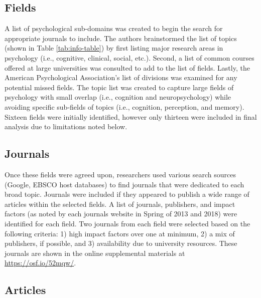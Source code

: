 \documentclass[english,man]{apa6}
\theoremstyle{definition}
\theoremstyle{definition}
\theoremstyle{definition}
\theoremstyle{remark}
\begin{document}
\subsection{Fields}\label{fields}

A list of psychological sub-domains was created to begin the search for
appropriate journals to include. The authors brainstormed the list of
topics (shown in Table \ref{tab:info-table}) by first listing major
research areas in psychology (i.e., cognitive, clinical, social, etc.).
Second, a list of common courses offered at large universities was
consulted to add to the list of fields. Lastly, the American
Psychological Association's list of divisions was examined for any
potential missed fields. The topic list was created to capture large
fields of psychology with small overlap (i.e., cognition and
neuropsychology) while avoiding specific sub-fields of topics (i.e.,
cognition, perception, and memory). Sixteen fields were initially
identified, however only thirteen were included in final analysis due to
limitations noted below.

\subsection{Journals}\label{journals}

Once these fields were agreed upon, researchers used various search
sources (Google, EBSCO host databases) to find journals that were
dedicated to each broad topic. Journals were included if they appeared
to publish a wide range of articles within the selected fields. A list
of journals, publishers, and impact factors (as noted by each journals
website in Spring of 2013 and 2018) were identified for each field. Two
journals from each field were selected based on the following criteria:
1) high impact factors over one at minimum, 2) a mix of publishers, if
possible, and 3) availability due to university resources. These
journals are shown in the online supplemental materials at
\url{https://osf.io/52mqw/}.

\subsection{Articles}\label{articles}
\end{document}

